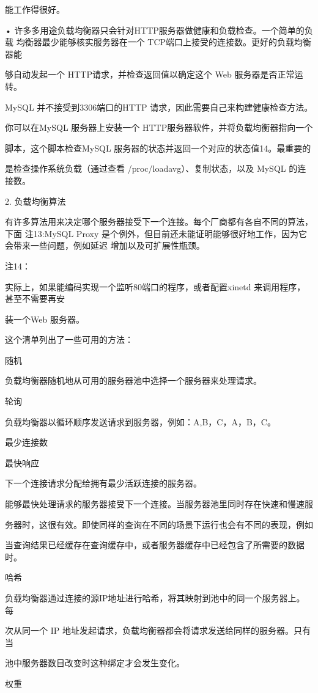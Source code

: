 能工作得很好。

• 许多多用途负载均衡器只会针对HTTP服务器做健康和负载检查。一个简单的负载
均衡器最少能够核实服务器在一个 TCP端口上接受的连接数。更好的负载均衡器能

够自动发起一个 HTTP请求，并检查返回值以确定这个 Web 服务器是否正常运转。

MySQL 并不接受到3306端口的HTTP 请求，因此需要自己来构建健康检查方法。

你可以在MySQL 服务器上安装一个 HTTP服务器软件，并将负载均衡器指向一个

脚本，这个脚本检查MySQL 服务器的状态并返回一个对应的状态值14。最重要的

是检查操作系统负载（通过查看 /proc/loadavg）、复制状态，以及 MySQL 的连接数。

2. 负载均衡算法

有许多算法用来决定哪个服务器接受下一个连接。每个厂商都有各自不同的算法，下面
注13:MySQL Proxy 是个例外，但目前还未能证明能够很好地工作，因为它会带来一些问题，例如延迟
增加以及可扩展性瓶颈。

注14：

实际上，如果能编码实现一个监听80端口的程序，或者配置xinetd 来调用程序，甚至不需要再安

装一个Web 服务器。

这个清单列出了一些可用的方法：

随机

负载均衡器随机地从可用的服务器池中选择一个服务器来处理请求。

轮询

负载均衡器以循环顺序发送请求到服务器，例如：A,B，C，A，B，C。

最少连接数

最快响应

下一个连接请求分配给拥有最少活跃连接的服务器。

能够最快处理请求的服务器接受下一个连接。当服务器池里同时存在快速和慢速服

务器时，这很有效。即使同样的查询在不同的场景下运行也会有不同的表现，例如

当查询结果已经缓存在查询缓存中，或者服务器缓存中已经包含了所需要的数据时。

哈希

负载均衡器通过连接的源IP地址进行哈希，将其映射到池中的同一个服务器上。每

次从同一个 IP 地址发起请求，负载均衡器都会将请求发送给同样的服务器。只有当

池中服务器数目改变时这种绑定才会发生变化。

权重

